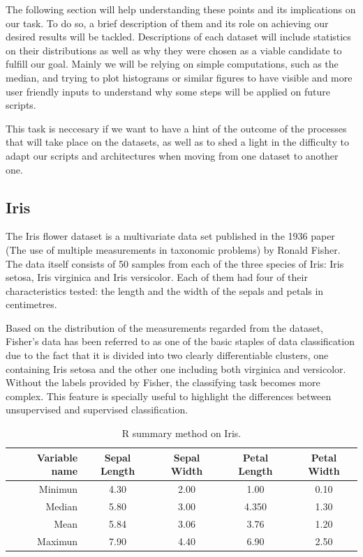 \documentclass[12pt]{report}
\begin{document}
The following section will help understanding these points and its implications on our task. To do so, a brief description of them and its role on achieving our desired results will be tackled. Descriptions of each dataset will include statistics on their distributions as well as why they were chosen as a viable candidate to fulfill our goal. Mainly we will be relying on simple computations, such as the median, and trying to plot histograms or similar figures to have visible and more user friendly inputs to understand why some steps will be applied on future scripts.\par
 
This task is neccesary if we want to have a hint of the outcome of the processes that will take place on the datasets, as well as to shed a light in the difficulty to adapt our scripts and architectures when moving from one dataset to another one.

 

\subsection{Iris}

The Iris flower dataset is a multivariate data set published in the 1936 paper (The use of multiple measurements in taxonomic problems) by Ronald Fisher. The data itself consists of 50 samples from each of the three species of Iris: Iris setosa, Iris virginica and Iris versicolor. Each of them had four of their characteristics tested: the length and the width of the sepals and petals in centimetres. \par

Based on the distribution of the measurements regarded from the dataset, Fisher's data has been referred to as one of the basic staples of data classification due to the fact that it is divided into two clearly differentiable clusters, one containing Iris setosa and the other one including both virginica and versicolor. Without the labels provided by Fisher, the classifying task becomes more complex. This feature is specially useful to highlight the differences between unsupervised and supervised classification.\newline

\begin{table}[H]
		\caption{R summary method on Iris.}
	\begin{center}
	\label{tab:table_Iris}
		\begin{tabular}{r|c|c|c|c} %
			\textbf{Variable name} & \textbf{Sepal Length} & \textbf{Sepal Width} & \textbf{Petal Length} & \textbf{Petal Width}\\
			\hline
			Minimun & 4.30 & 2.00 & 1.00 & 0.10\\
			Median & 5.80 & 3.00 & 4.350 & 1.30\\
			Mean & 5.84 & 3.06 & 3.76 & 1.20\\
			Maximun & 7.90 & 4.40 & 6.90 & 2.50\\
		\end{tabular}
	\end{center}
\end{table}
\end{document}
